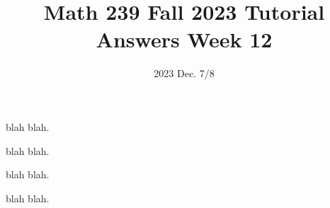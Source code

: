 \title{Math 239 Fall 2023 Tutorial Answers Week 12}

\date{2023 Dec. 7/8}
\maketitle

\begin{enumerate}
     blah blah.

    \newpage
     blah blah.

    \newpage
     blah blah.

    \newpage
     blah blah.
\end{enumerate}